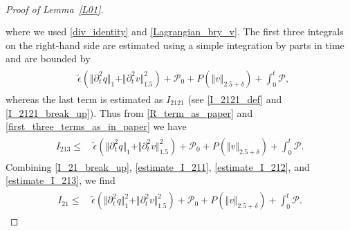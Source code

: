 \documentclass[10pt,reqno]{amsart}
\theoremstyle{plain}
\theoremstyle{definition}
\numberwithin{equation}{section}
\newcommand{\ccP}{\mathscr{P}}
\newcommand{\ccPz}{\mathscr{P}_0}
\newcommand{\de}{\delta}
\newcommand{\norm}[1]{\Vert#1\Vert}
\begin{document}
\begin{proof}[Proof of Lemma~\ref{L01}]
\begin{align}
\begin{split}
\end{split}
\nonumber
\end{align}
where we used \eqref{div_identity} and  \eqref{Lagrangian_bry_v}.
The first three integrals on the right-hand side 
are estimated using a simple integration by parts in time
and are bounded by
\begin{align}
\begin{split}
& \widetilde{\epsilon}( \norm{\partial^2_t q}_1 + \norm{\partial^2_t v}^2_{1.5} )  
+\ccPz
+ P(\norm{v}_{2.5+\de})
+ \int_0^t \ccP,
\end{split}
\label{first_three_terms_as_in_paper}
\end{align}
whereas the last term is estimated as 
$I_{2121}$ (see \eqref{I_2121_def} and \eqref{I_2121_break_up}). 
Thus from \eqref{R_term_as_paper} and \eqref{first_three_terms_as_in_paper} we have
\begin{align}
\begin{split}
I_{213} \leq & \,
\widetilde{\epsilon}(  \norm{\partial^2_t q}_1 + \norm{\partial^2_t v}^2_{1.5} )  
+\ccPz
+ P(\norm{ v}_{2.5+\de})
+ \int_0^t \ccP.
\end{split}
\label{estimate_I_213}
\end{align}
Combining \eqref{I_21_break_up}, 
 \eqref{estimate_I_211}, \eqref{estimate_I_212}, and
\eqref{estimate_I_213}, we find
\begin{align}
\begin{split}
I_{21} \leq &
\, \widetilde{\epsilon} ( \norm{\partial^2_t q}_1^2 + \norm{ \partial^2_t v}^2_{1.5} )
+\ccPz
 +  P( \norm{v}_{2.5+\de}) 
+ \int_0^t  \ccP.
\end{split}
\label{estimate_I_21}
\end{align}


\end{proof}
\end{document}
